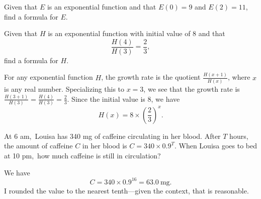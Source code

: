 \documentclass[12pt,fleqn,answers]{exam}
\newcommand\AM{{\sc am}}
\newcommand\PM{{\sc pm}}
\begin{document}
\begin{questions} 

\question [2] Given that $E$ is an exponential function and that $E(0)=9$
and $E(2) = 11$, find a formula for $E$.


\question [2] Given that $H$ is an exponential function with
initial value of $8$ and that
\begin{equation*}
   \frac{H(4)}{H(3)} = \frac{2}{3},
\end{equation*}
find a formula for $H$.
\begin{solution}%
    For any exponential function $H$, the growth rate is the quotient
    $\frac{H(x+1)}{H(x)}$, where $x$ is any real number. Specializing this 
    to $x=3$, we see that the
    growth rate is $\frac{H(3+1)}{H(3)} =  \frac{H(4)}{H(3)} = \frac{2}{3}$. Since the initial value is $8$, we
    have
    \begin{equation*}
        H(x) = 8 \times \left(\frac{2}{3} \right)^x.
    \end{equation*}

\end{solution}
\vfill
\newpage

\question [2]  At 6 \AM,\, Louisa has 340 mg of caffeine circulating 
in her blood. After $T$ hours, the amount of caffeine $C$ in her blood is
\(
     C = 340  \times  0.9^T
\).
When Louisa goes to bed at 10 \PM,\, how much caffeine is
still in circulation?
\begin{solution}[1.5in] We have
    \begin{equation*}
        C = 340 \times 0.9^{16} = \SI{63.0}{\milli\gram}.
    \end{equation*}
I rounded the value to the nearest tenth---given the context, that
is reasonable.
\end{solution}


\end{questions}
\end{document}
